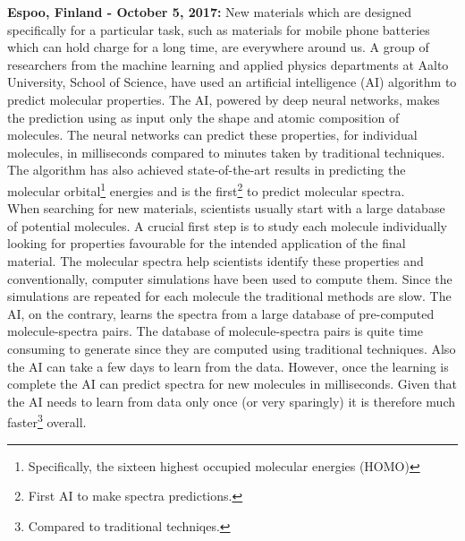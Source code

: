 \documentclass[a4paper]{article}
\title{\justify\fontsize{20}{20}\selectfont{AI developed by a group of researchers at Aalto University could significantly speed up the search for new materials.}}
\begin{document}
\date{}
\maketitle
%     

\noindent \textbf{Espoo, Finland - October 5, 2017:} New materials which are designed specifically for a particular task, such as materials for mobile phone batteries which can hold charge for a long time, are everywhere around us. A group of researchers from the machine learning and applied physics departments at Aalto University, School of Science, have used an artificial intelligence (AI) algorithm to predict molecular properties. The AI, powered by deep neural networks, makes the prediction using as input only the shape and atomic composition of molecules. The neural networks can predict these properties, for individual molecules, in milliseconds compared to minutes taken by traditional techniques. The algorithm has also achieved state-of-the-art results in predicting the molecular orbital\footnote{Specifically, the sixteen highest occupied molecular energies (HOMO)} energies and is the first\footnote{First AI to make spectra predictions.} to predict molecular spectra.\\

When searching for new materials, scientists usually start with a large database of potential molecules. A crucial first step is to study each molecule individually looking for properties favourable for the intended application of the final material. The molecular spectra help scientists identify these properties and conventionally, computer simulations have been used to compute them. Since the simulations are repeated for each molecule the traditional methods are slow. The AI, on the contrary, learns the spectra from a large database of pre-computed molecule-spectra pairs. The database of molecule-spectra pairs is quite time consuming to generate since they are computed using traditional techniques. Also the AI can take a few days to learn from the data. However, once the learning is complete the AI can predict spectra for new molecules in milliseconds. Given that the AI needs to learn from data only once (or very sparingly) it is therefore much faster\footnote{Compared to traditional techniqes.} overall.
\end{document}
